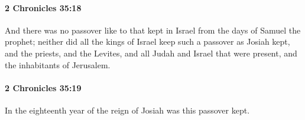 		\paragraph{2 Chronicles 35:18} %
			\label{2CHRONICLES-35-18}

			And there was no passover like to that kept in Israel from the days of Samuel the prophet; neither did all the kings of Israel keep such a passover as Josiah kept, and the priests, and the Levites, and all Judah and Israel that were present, and the inhabitants of Jerusalem.


		\paragraph{2 Chronicles 35:19} %
			\label{2CHRONICLES-35-19}

			In the eighteenth year of the reign of Josiah was this passover kept.


